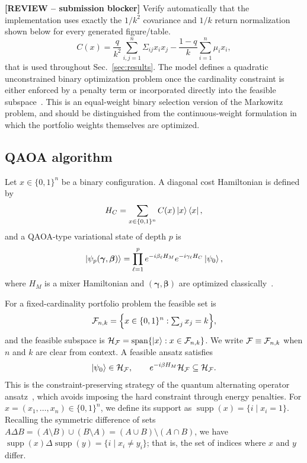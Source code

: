 {\color{red}\textbf{[REVIEW -- submission blocker]} Verify automatically that the implementation uses exactly the $1/k^2$ covariance and $1/k$ return normalization shown below for every generated figure/table.}
\begin{equation}
    C(x)
    =
    \frac{q}{k^{2}}\sum_{i,j=1}^{n}\Sigma_{ij}x_ix_j
    -\frac{1-q}{k}\sum_{i=1}^{n}\mu_ix_i ,
    \label{eq:portfolio-cost-normalised}
\end{equation}
that is used throughout Sec.~\ref{sec:results}. The model defines a quadratic
unconstrained binary
optimization problem once the cardinality constraint is either enforced by a
penalty term or incorporated directly into the feasible
subspace~\cite{Lucas2014,Venturelli2019}. This is an equal-weight binary
selection version of the Markowitz problem, and should be distinguished from
the continuous-weight formulation in which the portfolio weights themselves
are optimized.

\subsection{QAOA algorithm}

Let $x\in\{0,1\}^n$ be a binary configuration. A diagonal cost Hamiltonian is
defined by
\begin{equation}
    H_C =
    \sum_{x\in\{0,1\}^n} C(x)\ket{x}\bra{x},
    \label{eq:cost-hamiltonian}
\end{equation}
and a QAOA-type variational state of depth $p$ is
\begin{equation}
    \ket{\psi_p(\boldsymbol{\gamma},\boldsymbol{\beta})}
    =
    \prod_{\ell=1}^{p}
    e^{-i\beta_\ell H_M}
    e^{-i\gamma_\ell H_C}
    \ket{\psi_0},
    \label{eq:qaoa-type-state}
\end{equation}
where $H_M$ is a mixer Hamiltonian and
$(\boldsymbol{\gamma},\boldsymbol{\beta})$ are optimized
classically~\cite{Farhi2014,Cerezo2021,Blekos2024}.

For a fixed-cardinality portfolio problem the feasible set is
\begin{equation}
    \mathcal{F}_{n,k}
    =
    \Bigl\{
    x\in\{0,1\}^{n}:
    \textstyle\sum_{j}x_j=k
    \Bigr\},
    \label{eq:feasible-set}
\end{equation}
and the feasible subspace is
$\mathcal{H}_{\mathcal{F}}=\operatorname{span}\{\ket{x}:x\in\mathcal{F}_{n,k}\}$. We write
$\mathcal{F}\equiv\mathcal{F}_{n,k}$ when $n$ and $k$ are clear from context. A feasible ansatz
satisfies
\begin{equation}
    \ket{\psi_0}\in\mathcal{H}_{\mathcal{F}},
    \qquad
    e^{-i\beta H_M}\mathcal{H}_{\mathcal{F}}
    \subseteq
    \mathcal{H}_{\mathcal{F}} .
    \label{eq:feasible-condition}
\end{equation}
This is the constraint-preserving strategy of the quantum alternating operator
ansatz~\cite{Hadfield2019}, which avoids imposing the hard constraint through
energy penalties. For $x = (x_1,\dots,x_n) \in \{0,1\}^n$, we define its support as $\operatorname{supp}(x) = \{i \mid x_i = 1\}$. Recalling the symmetric difference of sets $A \Delta B = (A \setminus B) \cup (B \setminus A) = (A \cup B) \setminus (A \cap B)$, we have $\operatorname{supp}(x) \Delta \operatorname{supp}(y) = \{i \mid x_i \neq y_i\}$; that is, the set of indices where $x$ and $y$ differ.


